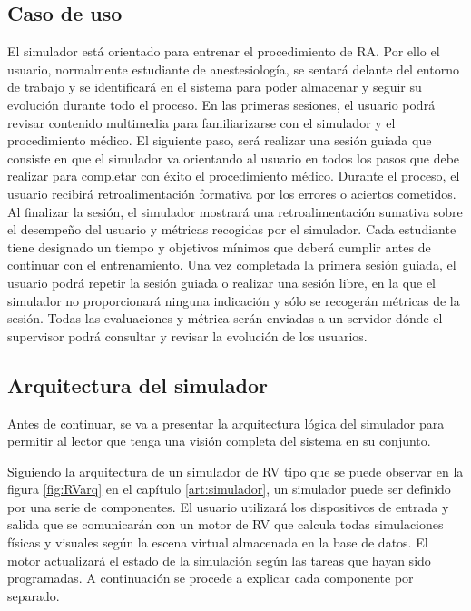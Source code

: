 \subsection{Caso de uso}
\label{rasim:casodeusorasim}

El simulador está orientado para entrenar el procedimiento de \ac{RA}. Por ello el usuario, normalmente estudiante de anestesiología, se sentará delante del entorno de trabajo y se identificará en el sistema para poder almacenar y seguir su evolución durante todo el proceso. En las primeras sesiones, el usuario podrá revisar contenido multimedia para familiarizarse con el simulador y el procedimiento médico. El siguiente paso, será realizar una sesión guiada  que  consiste en que el simulador va orientando al usuario en todos los pasos que debe realizar para completar con éxito el procedimiento médico. Durante el proceso, el usuario recibirá retroalimentación formativa por los errores o aciertos cometidos. Al finalizar la sesión, el simulador mostrará una retroalimentación sumativa sobre el desempeño del usuario y métricas recogidas por el simulador. Cada estudiante tiene designado un tiempo y objetivos mínimos que deberá cumplir antes de continuar con el entrenamiento. Una vez completada la primera sesión guiada, el usuario podrá repetir la sesión guiada o realizar una sesión libre, en la que el simulador no proporcionará ninguna indicación y sólo se recogerán métricas de la sesión. Todas las evaluaciones y métrica serán enviadas a un servidor dónde el supervisor podrá consultar y revisar la evolución de los usuarios.


\subsection{Arquitectura del simulador}
\label{rasim:arqrasim}

Antes de continuar, se va a presentar la arquitectura lógica del simulador para permitir al lector que tenga una visión completa del sistema en su conjunto.

Siguiendo la arquitectura de un simulador de \ac{RV} tipo que se puede observar en la figura \ref{fig:RVarq}  en el capítulo \ref{art:simulador}, un simulador puede ser definido por una serie de componentes. El usuario utilizará los dispositivos de entrada y salida que se comunicarán con un motor de \ac{RV} que calcula todas simulaciones físicas y visuales según la escena virtual almacenada en la base de datos. El motor actualizará el estado de la simulación según las tareas que hayan sido programadas. A continuación se procede a explicar cada componente por separado. 


